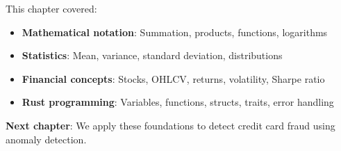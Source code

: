 This chapter covered:

\begin{itemize}
    \item \textbf{Mathematical notation}: Summation, products, functions,
      logarithms
    \item \textbf{Statistics}: Mean, variance, standard deviation,
      distributions
    \item \textbf{Financial concepts}: Stocks, OHLCV, returns, volatility,
      Sharpe ratio
    \item \textbf{Rust programming}: Variables, functions, structs, traits,
      error handling
\end{itemize}

\vspace{1em}
\noindent\textbf{Next chapter}: We apply these foundations to detect credit
card fraud using anomaly detection.
